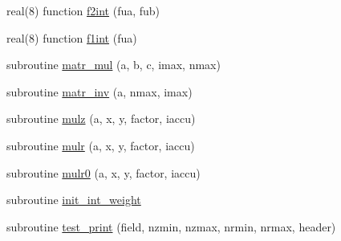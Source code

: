 \begin{DoxyCompactItemize}
\item 
real(8) function \hyperlink{namespacegrid_aa872a933c56de60d6abf31fd7bec2814}{f2int} (fua, fub)
\item 
real(8) function \hyperlink{namespacegrid_a826ce21cf77769b59324009174610ab9}{f1int} (fua)
\item 
subroutine \hyperlink{namespacegrid_a771bf7fcf3d65544eb8badcb0d8fe528}{matr\+\_\+mul} (a, b, c, imax, nmax)
\item 
subroutine \hyperlink{namespacegrid_a3fa4b3b24e221d4f98dc90fc2bc54c21}{matr\+\_\+inv} (a, nmax, imax)
\item 
subroutine \hyperlink{namespacegrid_a094af63a3600c9b47d99fc5eb2b0b28c}{mulz} (a, x, y, factor, iaccu)
\item 
subroutine \hyperlink{namespacegrid_a729ef173ecbf5623d1bf2c94fcc0bf92}{mulr} (a, x, y, factor, iaccu)
\item 
subroutine \hyperlink{namespacegrid_aa66349c5be01c56fead6f21b56fda0a2}{mulr0} (a, x, y, factor, iaccu)
\item 
subroutine \hyperlink{namespacegrid_a8424de604ef58a42851aa63b52bf535f}{init\+\_\+int\+\_\+weight}
\item 
subroutine \hyperlink{namespacegrid_ad009f2e6c140cc067f8aa8f9ffac21b2}{test\+\_\+print} (field, nzmin, nzmax, nrmin, nrmax, header)
\end{DoxyCompactItemize}
